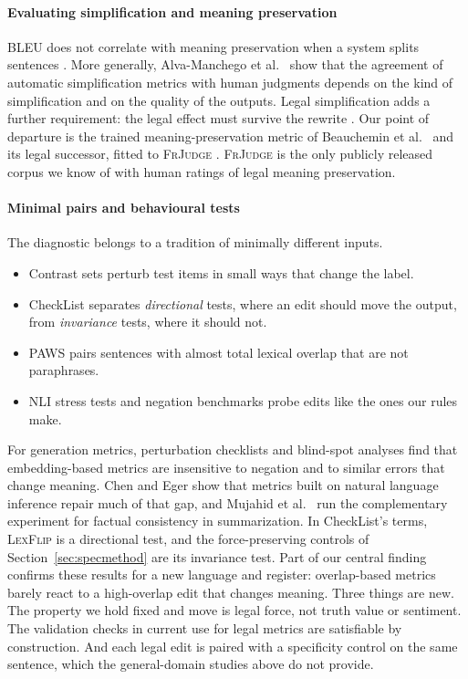 \documentclass{BVP_JCLLT}
\newcommand{\rev}[1]{#1}
\newcommand{\rev}[1]{{\color{revcol}#1}}
\begin{document}
\rev{\paragraph{Evaluating simplification and meaning preservation}
BLEU does not correlate with meaning preservation when a system splits sentences
\cite{sulem2018bleu}. More generally, Alva-Manchego et al.\
\cite{alvamanchego2021unsuitability} show that the agreement of automatic
simplification metrics with human judgments depends on the kind of
simplification and on the quality of the outputs. Legal simplification adds a
further requirement: the legal effect must survive the rewrite
\cite{garimella2022legalsimp}. Our point of departure is the trained
meaning-preservation metric of Beauchemin et al.\ \cite{beauchemin2023meaningbert}
and its legal successor, fitted to \textsc{FrJudge} \cite{beauchemin2025judgebert}.
\textsc{FrJudge} is the only publicly released corpus we know of with human
ratings of legal meaning preservation.

\paragraph{Minimal pairs and behavioural tests}
The diagnostic belongs to a tradition of minimally different inputs.

\begin{itemize}\itemsep1pt
\item Contrast sets \cite{gardner2020contrast} perturb test items in small ways
  that change the label.
\item CheckList \cite{ribeiro2020checklist} separates \emph{directional} tests,
  where an edit should move the output, from \emph{invariance} tests, where it
  should not.
\item PAWS \cite{zhang2019paws} pairs sentences with almost total lexical
  overlap that are not paraphrases.
\item NLI stress tests \cite{naik2018stress} and negation benchmarks
  \cite{hossain2020negation} probe edits like the ones our rules make.
\end{itemize}

For generation metrics, perturbation checklists \cite{sai2021perturbation} and
blind-spot analyses \cite{he2023blindspots} find that embedding-based metrics are
insensitive to negation and to similar errors that change meaning. Chen and Eger
\cite{chen2023menli} show that metrics built on natural language inference
repair much of that gap, and Mujahid et al.\ \cite{mujahid2026stress} run the
complementary experiment for factual consistency in summarization. In
CheckList's terms, \textsc{LexFlip} is a directional test, and the
force-preserving controls of Section~\ref{sec:specmethod} are its invariance
test. Part of our central finding confirms these results for a new language and
register: overlap-based metrics barely react to a high-overlap edit that changes
meaning. Three things are new. The property we hold fixed and move is legal
force, not truth value or sentiment. The validation checks in current use for
legal metrics are satisfiable by construction. And each legal edit is paired with
a specificity control on the same sentence, which the general-domain studies
above do not provide.

}
\end{document}

